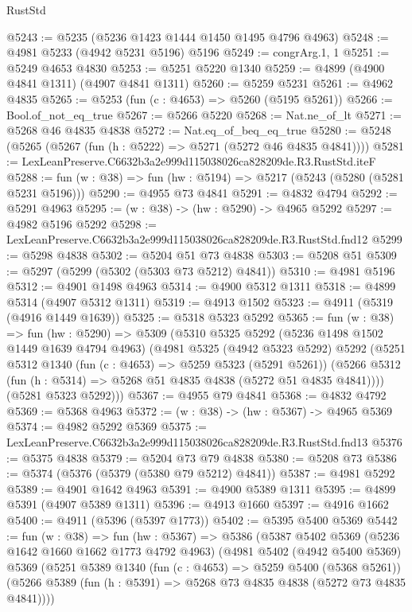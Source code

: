 \begin{lexlean}{RustStd}
\begin{coremodule}
@5243 := @5235 (@5236 @1423 @1444 @1450 @1495 @4796 @4963)
@5248 := @4981 @5233 (@4942 @5231 @5196) @5196
@5249 := congrArg.{1, 1}
@5251 := @5249 @4653 @4830
@5253 := @5251 @5220 @1340
@5259 := @4899 (@4900 @4841 @1311) (@4907 @4841 @1311)
@5260 := @5259 @5231
@5261 := @4962 @4835
@5265 := @5253 (fun (c : @4653) => @5260 (@5195 @5261))
@5266 := Bool.of_not_eq_true
@5267 := @5266 @5220
@5268 := Nat.ne_of_lt
@5271 := @5268 @46 @4835 @4838
@5272 := Nat.eq_of_beq_eq_true
@5280 := @5248 (@5265 (@5267 (fun (h : @5222) => @5271 (@5272 @46 @4835 @4841))))
@5281 := LexLeanPreserve.C6632b3a2e999d115038026ca828209de.R3.RustStd.iteF
@5288 := fun (w : @38) => fun (hw : @5194) => @5217 (@5243 (@5280 (@5281 @5231 @5196)))
@5290 := @4955 @73 @4841
@5291 := @4832 @4794
@5292 := @5291 @4963
@5295 := (w : @38) -> (hw : @5290) -> @4965 @5292
@5297 := @4982 @5196 @5292
@5298 := LexLeanPreserve.C6632b3a2e999d115038026ca828209de.R3.RustStd.fnd12
@5299 := @5298 @4838
@5302 := @5204 @51 @73 @4838
@5303 := @5208 @51
@5309 := @5297 (@5299 (@5302 (@5303 @73 @5212) @4841))
@5310 := @4981 @5196
@5312 := @4901 @1498 @4963
@5314 := @4900 @5312 @1311
@5318 := @4899 @5314 (@4907 @5312 @1311)
@5319 := @4913 @1502
@5323 := @4911 (@5319 (@4916 @1449 @1639))
@5325 := @5318 @5323 @5292
@5365 := fun (w : @38) =>
  fun (hw : @5290) =>
  @5309
    (@5310
      @5325
      @5292
      (@5236 @1498 @1502 @1449 @1639 @4794 @4963)
      (@4981
        @5325
        (@4942 @5323 @5292)
        @5292
        (@5251
          @5312
          @1340
          (fun (c : @4653) => @5259 @5323 (@5291 @5261))
          (@5266 @5312 (fun (h : @5314) => @5268 @51 @4835 @4838 (@5272 @51 @4835 @4841))))
        (@5281 @5323 @5292)))
@5367 := @4955 @79 @4841
@5368 := @4832 @4792
@5369 := @5368 @4963
@5372 := (w : @38) -> (hw : @5367) -> @4965 @5369
@5374 := @4982 @5292 @5369
@5375 := LexLeanPreserve.C6632b3a2e999d115038026ca828209de.R3.RustStd.fnd13
@5376 := @5375 @4838
@5379 := @5204 @73 @79 @4838
@5380 := @5208 @73
@5386 := @5374 (@5376 (@5379 (@5380 @79 @5212) @4841))
@5387 := @4981 @5292
@5389 := @4901 @1642 @4963
@5391 := @4900 @5389 @1311
@5395 := @4899 @5391 (@4907 @5389 @1311)
@5396 := @4913 @1660
@5397 := @4916 @1662
@5400 := @4911 (@5396 (@5397 @1773))
@5402 := @5395 @5400 @5369
@5442 := fun (w : @38) =>
  fun (hw : @5367) =>
  @5386
    (@5387
      @5402
      @5369
      (@5236 @1642 @1660 @1662 @1773 @4792 @4963)
      (@4981
        @5402
        (@4942 @5400 @5369)
        @5369
        (@5251
          @5389
          @1340
          (fun (c : @4653) => @5259 @5400 (@5368 @5261))
          (@5266 @5389 (fun (h : @5391) => @5268 @73 @4835 @4838 (@5272 @73 @4835 @4841))))

\end{coremodule}
\end{lexlean}
